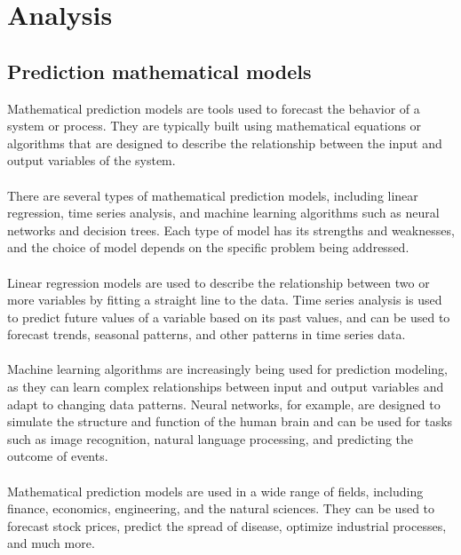 \chapter{Analysis}\label{analysis}
      \section{Prediction mathematical models}
      Mathematical prediction models are tools used to forecast the behavior of a system
      or process. They are typically built using mathematical
      equations or algorithms that are designed to describe the relationship between
      the input and output variables of the system.\\
    \\
    There are several types of mathematical prediction models, including linear
    regression, time series analysis, and machine learning algorithms such as neural
    networks and decision trees. Each type of model has its strengths and weaknesses,
    and the choice of model depends on the specific problem being addressed.\\
    \\
    Linear regression models are used to describe the relationship between two or more
    variables by fitting a straight line to the data. Time series analysis is used
    to predict future values of a variable based on its past values, and can be used
    to forecast trends, seasonal patterns, and other patterns in time series data.\\
    \\
    Machine learning algorithms are increasingly being used for prediction modeling,
    as they can learn complex relationships between input and output variables and
    adapt to changing data patterns. Neural networks, for example, are designed
    to simulate the structure and function of the human brain and can be used for
    tasks such as image recognition, natural language processing, and predicting
    the outcome of events.\\
    \\
    Mathematical prediction models are used in a wide range of fields, including
    finance, economics, engineering, and the natural sciences. They can be used
    to forecast stock prices, predict the spread of disease, optimize industrial
    processes, and much more.

